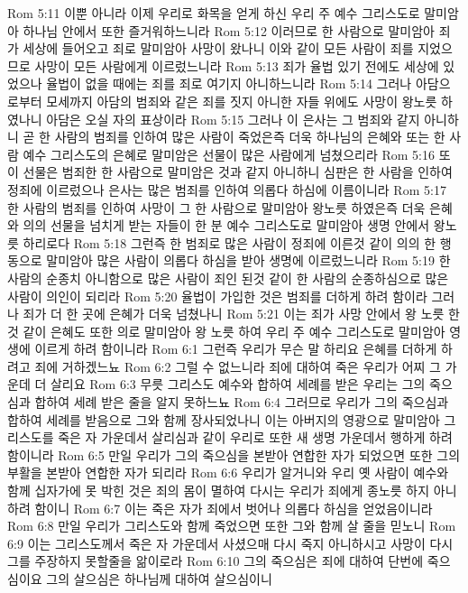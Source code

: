 Rom 5:11  이뿐 아니라 이제 우리로 화목을 얻게 하신 우리 주 예수 그리스도로 말미암아 하나님 안에서 또한 즐거워하느니라
Rom 5:12  이러므로 한 사람으로 말미암아 죄가 세상에 들어오고 죄로 말미암아 사망이 왔나니 이와 같이 모든 사람이 죄를 지었으므로 사망이 모든 사람에게 이르렀느니라
Rom 5:13  죄가 율법 있기 전에도 세상에 있었으나 율법이 없을 때에는 죄를 죄로 여기지 아니하느니라
Rom 5:14  그러나 아담으로부터 모세까지 아담의 범죄와 같은 죄를 짓지 아니한 자들 위에도 사망이 왕노릇 하였나니 아담은 오실 자의 표상이라
Rom 5:15  그러나 이 은사는 그 범죄와 같지 아니하니 곧 한 사람의 범죄를 인하여 많은 사람이 죽었은즉 더욱 하나님의 은혜와 또는 한 사람 예수 그리스도의 은혜로 말미암은 선물이 많은 사람에게 넘쳤으리라
Rom 5:16  또 이 선물은 범죄한 한 사람으로 말미암은 것과 같지 아니하니 심판은 한 사람을 인하여 정죄에 이르렀으나 은사는 많은 범죄를 인하여 의롭다 하심에 이름이니라
Rom 5:17  한 사람의 범죄를 인하여 사망이 그 한 사람으로 말미암아 왕노릇 하였은즉 더욱 은혜와 의의 선물을 넘치게 받는 자들이 한 분 예수 그리스도로 말미암아 생명 안에서 왕노릇 하리로다
Rom 5:18  그런즉 한 범죄로 많은 사람이 정죄에 이른것 같이 의의 한 행동으로 말미암아 많은 사람이 의롭다 하심을 받아 생명에 이르렀느니라
Rom 5:19  한 사람의 순종치 아니함으로 많은 사람이 죄인 된것 같이 한 사람의 순종하심으로 많은 사람이 의인이 되리라
Rom 5:20  율법이 가입한 것은 범죄를 더하게 하려 함이라 그러나 죄가 더 한 곳에 은혜가 더욱 넘쳤나니
Rom 5:21  이는 죄가 사망 안에서 왕 노릇 한 것 같이 은혜도 또한 의로 말미암아 왕 노릇 하여 우리 주 예수 그리스도로 말미암아 영생에 이르게 하려 함이니라
Rom 6:1  그런즉 우리가 무슨 말 하리요 은혜를 더하게 하려고 죄에 거하겠느뇨
Rom 6:2  그럴 수 없느니라 죄에 대하여 죽은 우리가 어찌 그 가운데 더 살리요
Rom 6:3  무릇 그리스도 예수와 합하여 세례를 받은 우리는 그의 죽으심과 합하여 세례 받은 줄을 알지 못하느뇨
Rom 6:4  그러므로 우리가 그의 죽으심과 합하여 세례를 받음으로 그와 함께 장사되었나니 이는 아버지의 영광으로 말미암아 그리스도를 죽은 자 가운데서 살리심과 같이 우리로 또한 새 생명 가운데서 행하게 하려 함이니라
Rom 6:5  만일 우리가 그의 죽으심을 본받아 연합한 자가 되었으면 또한 그의 부활을 본받아 연합한 자가 되리라
Rom 6:6  우리가 알거니와 우리 옛 사람이 예수와 함께 십자가에 못 박힌 것은 죄의 몸이 멸하여 다시는 우리가 죄에게 종노릇 하지 아니하려 함이니
Rom 6:7  이는 죽은 자가 죄에서 벗어나 의롭다 하심을 얻었음이니라
Rom 6:8  만일 우리가 그리스도와 함께 죽었으면 또한 그와 함께 살 줄을 믿노니
Rom 6:9  이는 그리스도께서 죽은 자 가운데서 사셨으매 다시 죽지 아니하시고 사망이 다시 그를 주장하지 못할줄을 앎이로라
Rom 6:10  그의 죽으심은 죄에 대하여 단번에 죽으심이요 그의 살으심은 하나님께 대하여 살으심이니

